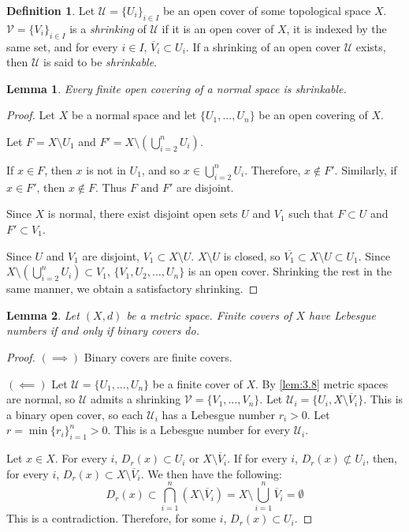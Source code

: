 \documentclass[openany, amssymb, psamsfonts]{amsart}
\let\fullref\autoref
\newtheorem{lem}{Lemma}[section]
\theoremstyle{definition}
\newtheorem{defn}{Definition}[section]
\numberwithin{equation}{section}
\begin{document}
\begin{defn}
  Let $\mathcal{U} = \{U_i\}_{i\in I}$ be an open cover of some topological space $X$. $\mathcal{V} = \{V_i\}_{i \in I}$ is a \emph{shrinking} of $\mathcal{U}$ if it is an open cover of $X$, it is indexed by the same set, and for every $i \in I$, $\overline{V}_i \subset U_i$. If a shrinking of an open cover $\mathcal{U}$ exists, then $\mathcal{U}$ is said to be \emph{shrinkable}.
\end{defn}
\begin{lem}
  Every finite open covering of a normal space is shrinkable.
\end{lem}
\begin{proof}
  Let $X$ be a normal space and let $\{U_1, \ldots, U_n\}$ be an open covering of $X$. 

  Let $F = X \setminus U_1$ and $F' = X \setminus \left(\bigcup_{i=2}^n U_i\right)$. 

  If $x \in F$, then $x$ is not in $U_1$, and so $x \in \bigcup_{i=2}^n U_i$. Therefore, $x \not\in F'$. Similarly, if $x \in F'$, then $x \not\in F$. Thus $F$ and $F'$ are disjoint. 

  Since $X$ is normal, there exist disjoint open sets $U$ and $V_1$ such that $F \subset U$ and $F' \subset V_1$. 

  Since $U$ and $V_1$ are disjoint, $V_1 \subset X \setminus U$. $X\setminus U$ is closed, so $\overline{V_1} \subset X \setminus U \subset U_1$. Since $X \setminus \left(\bigcup_{i=2}^n U_i\right) \subset V_1$, $\{V_1, U_2, \ldots, U_n\}$ is an open cover. Shrinking the rest in the same manner, we obtain a satisfactory shrinking. 
\end{proof}
\begin{lem}\label{lem:4.5}
  Let $(X,d)$ be a metric space. Finite covers of $X$ have Lebesgue numbers if and only if binary covers do.
\end{lem}
\begin{proof}
  $(\implies)$ Binary covers are finite covers. 

  $(\impliedby)$ Let $\mathcal{U} = \{U_1, \ldots, U_n\}$ be a finite cover of $X$. By \fullref{lem:3.8} metric spaces are normal, so $\mathcal{U}$ admits a shrinking $\mathcal{V} = \{V_1, \ldots, V_n\}$. Let $\mathcal{U}_i = \{U_i, X \setminus \overline{V}_i\}$. This is a binary open cover, so each $\mathcal{U}_i$ has a Lebesgue number $r_i > 0$. Let $r = \min\{r_i\}_{i=1}^n > 0$. This is a Lebesgue number for every $\mathcal{U}_i$.

  Let $x \in X$. For every $i$, $D_r(x) \subset U_i$ or $X \setminus \overline{V}_i$. If for every $i$, $D_r(x)\not\subset U_i$, then, for every $i$, $D_r(x) \subset X \setminus \overline{V}_i$. We then have the following:
  \[
    D_r(x) \subset \bigcap_{i=1}^n (X \setminus \overline{V}_i) = X \setminus \bigcup_{i=1}^n \overline{V}_i = \emptyset
  \]
  This is a contradiction. Therefore, for some $i$, $D_r(x) \subset U_i$. 
\end{proof}
\end{document}
